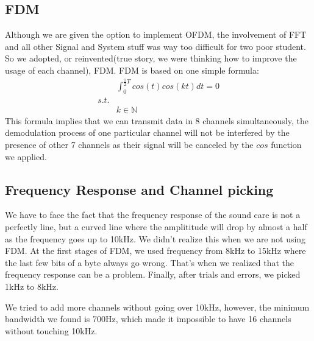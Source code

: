 \documentclass[conference,compsoc]{IEEEtran}
\begin{document}
	\subsection{FDM}
		Although we are given the option to implement OFDM, the involvement of FFT and all other Signal and System stuff was way too difficult for two poor student. 
		So we adopted, or reinvented(true story, we were thinking how to improve the usage of each channel), FDM.
		FDM is based on one simple formula:
		\begin{equation*} \begin{aligned}
			& \int_{0}^{\frac{1}{2}T} cos(t)cos(kt)dt = 0 \\
			s.t. \\
			& k \in \mathbb{N}
		\end{aligned} \end{equation*}
		This formula implies that we can transmit data in 8 channels simultaneously, the demodulation process of one particular channel will not be interfered by the presence of other 7 channels as their signal will be canceled by the $cos$ function we applied.
	
	\subsection{Frequency Response and Channel picking}
		We have to face the fact that the frequency response of the sound care is not a perfectly line, but a curved line where the amplititude will drop by almost a half as the frequency goes up to 10kHz.
		We didn't realize this when we are not using FDM. 
		At the first stages of FDM, we used frequency from 8kHz to 15kHz where the last few bits of a byte always go wrong. 
		That's when we realized that the frequency response can be a problem.
		Finally, after trials and errors, we picked 1kHz to 8kHz.
		\par
		We tried to add more channels without going over 10kHz, however, the minimum bandwidth we found is 700Hz, which made it impossible to have 16 channels without touching 10kHz.

\end{document}
